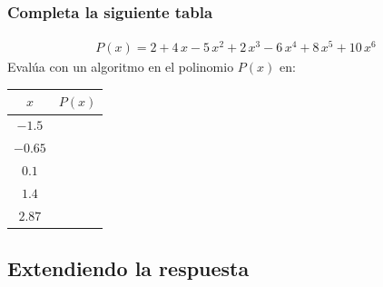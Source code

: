 \documentclass[12pt]{beamer}
\begin{document}
\begin{frame}
\frametitle{Completa la siguiente tabla}
\begin{align*}
P (x) = 2 + 4 \, x - 5 \, x^{2} + 2 \, x^{3} - 6 \, x^{4} + 8 \, x^{5} + 10 \, x^{6}
\end{align*}
Evalúa con un algoritmo en \python{} el polinomio $P (x)$ en:
\begin{table}
\renewcommand{\arraystretch}{0.8}
\centering
\begin{tabular}{c | c}
$x$ & $P (x)$ \\ \hline
$-1.5$ & \\ \hline
$-0.65$ & \\ \hline
$0.1$ & \\ \hline
$1.4$ & \\ \hline
$2.87$ & \\ 
\end{tabular}
\end{table}
\end{frame}

\subsection*{Extendiendo la respuesta}
\end{document}
